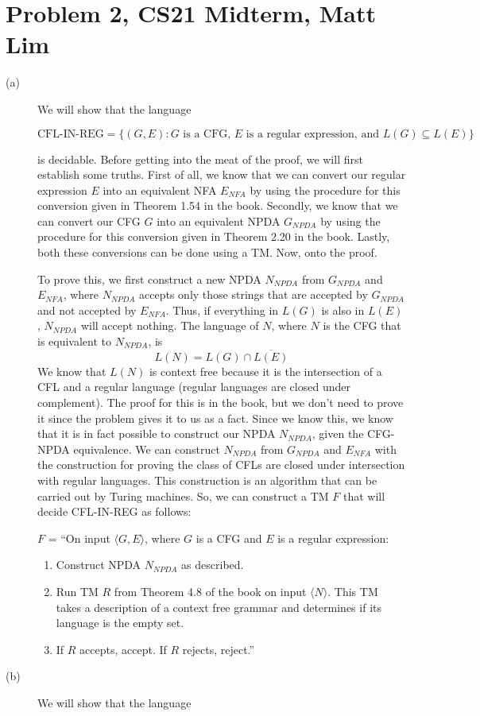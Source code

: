\documentclass{article}
\begin{document}
\section*{Problem 2, CS21 Midterm, Matt Lim}
\begin{description}
    \item[(a)] We will show that the language

    \[ \text{CFL-IN-REG} = \{(G, E) : \text{$G$ is a CFG, $E$ is a regular
    expression, and } L(G) \subseteq L(E)\} \]

    is decidable. Before getting into the meat of the proof, we will first
    establish some truths. First of all, we know that we can convert our
    regular expression $E$ into an equivalent NFA $E_{NFA}$ by using
    the procedure for this conversion given in Theorem 1.54 in the book.
    Secondly, we know that we can convert our CFG $G$ into an equivalent
    NPDA $G_{NPDA}$ by using the procedure for this conversion given in
    Theorem 2.20 in the book. Lastly, both these conversions can be
    done using a TM. Now, onto the proof.

    To prove this, we first construct a new NPDA $N_{NPDA}$ from $G_{NPDA}$
    and $E_{NFA}$, where $N_{NPDA}$ accepts only
    those strings that are accepted by $G_{NPDA}$ and not accepted by $E_{NFA}$.
    Thus, if everything in $L(G)$ is also in $L(E)$, $N_{NPDA}$ will accept
    nothing.  The language of $N$, where $N$ is the CFG that is equivalent
    to $N_{NPDA}$, is
    \[ L(N) = L(G) \cap \overline{L(E)} \]
    We know that $L(N)$ is context free because it is the intersection
    of a CFL and a regular language (regular languages are closed
    under complement). The proof for this is in the book, but we don't
    need to prove it since the problem gives it to us as a fact.
    Since we know this, we know that it is
    in fact possible to construct our NPDA $N_{NPDA}$, given
    the CFG-NPDA equivalence. We can construct $N_{NPDA}$ from $G_{NPDA}$
    and $E_{NFA}$ with the construction for proving the class of CFLs
    are closed under intersection with regular languages. This construction
    is an algorithm that can be carried out by Turing machines.
    So, we can construct a TM
    $F$ that will decide CFL-IN-REG as follows:

    $F$ = ``On input $\langle G,E \rangle$, where $G$ is a CFG and $E$ is
    a regular expression:
        \begin{enumerate}
            \item Construct NPDA $N_{NPDA}$ as described.
            \item Run TM $R$ from Theorem 4.8 of the book on input
                $\langle N \rangle$. This TM takes a description
                of a context free grammar and determines if its language is
                the empty set.
            \item If $R$ accepts, accept. If $R$ rejects, reject.''
        \end{enumerate}
    \item[(b)] We will show that the language


\end{description}
\end{document}
